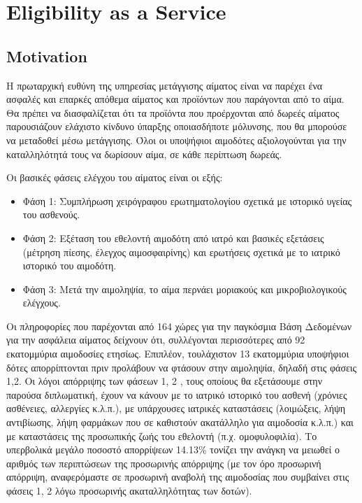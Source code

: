 \section{Eligibility as a Service}

			\subsection{Motivation}
			
						
			Η πρωταρχική ευθύνη της υπηρεσίας μετάγγισης αίματος είναι να παρέχει ένα ασφαλές και
επαρκές απόθεμα αίματος και προϊόντων που παράγονται από το αίμα. Θα πρέπει να διασφαλίζεται ότι τα προϊόντα που προέρχονται από δωρεές αίματος παρουσιάζουν ελάχιστο κίνδυνο ύπαρξης οποιασδήποτε μόλυνσης, που θα μπορούσε να μεταδοθεί μέσω μετάγγισης. Όλοι οι υποψήφιοι αιμοδότες αξιολογούνται για την καταλληλότητά τους να δωρίσουν αίμα, σε κάθε περίπτωση δωρεάς. 
		
		Οι βασικές φάσεις ελέγχου του αίματος είναι οι εξής:
		\begin{itemize}
		\item	Φάση 1: Συμπλήρωση χειρόγραφου ερωτηματολογίου σχετικά με ιστορικό υγείας του ασθενούς.
		\item Φάση 2: Εξέταση του εθελοντή αιμοδότη από ιατρό και βασικές εξετάσεις (μέτρηση πίεσης, έλεγχος αιμοσφαιρίνης) και ερωτήσεις σχετικά με το ιατρικό ιστορικό του αιμοδότη.
		\item 	Φάση 3: Μετά την αιμοληψία, το αίμα περνάει μοριακούς και μικροβιολογικούς ελέγχους.
		\end{itemize}		 
		
		Οι πληροφορίες που παρέχονται από 164 χώρες για την παγκόσμια Βάση Δεδομένων για την ασφάλεια αίματος δείχνουν ότι, συλλέγονται περισσότερες από 92 εκατομμύρια αιμοδοσίες ετησίως. Επιπλέον, τουλάχιστον 13 εκατομμύρια υποψήφιοι δότες απορρίπτονται πριν προλάβουν να φτάσουν στην αιμοληψία, δηλαδή στις φάσεις 1,2. \cite{safety} Οι λόγοι απόρριψης των φάσεων 1, 2 , τους οποίους θα εξετάσουμε στην παρούσα διπλωματική, έχουν να κάνουν με το ιατρικό ιστορικό του ασθενή (χρόνιες ασθένειες, αλλεργίες κ.λ.π.), με υπάρχουσες ιατρικές καταστάσεις (λοιμώξεις, λήψη αντιβίωσης, λήψη φαρμάκων που σε καθιστούν ακατάλληλο για  αιμοδοσία κ.λ.π.) και με καταστάσεις της προσωπικής ζωής του εθελοντή (π.χ. ομοφυλοφιλία). Το υπερβολικά μεγάλο ποσοστό απορρίψεων 14.13\% τονίζει την ανάγκη να μειωθεί ο αριθμός των περιπτώσεων της προσωρινής απόρριψης (με τον όρο προσωρινή απόρριψη, αναφερόμαστε σε προσωρινή αναβολή της αιμοδοσίας που συμβαίνει στις φάσεις 1, 2 λόγω προσωρινής ακαταλληλότητας των δοτών).

